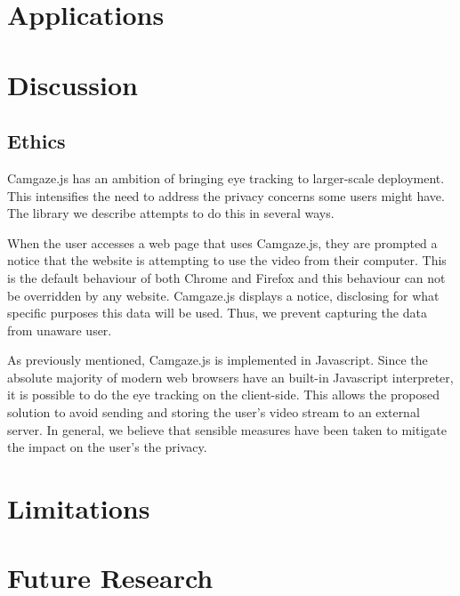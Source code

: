 \documentclass[annual]{acmsiggraph}
\begin{document}
\section{Applications}

\section{Discussion}

\subsection{Ethics}
Camgaze.js has an ambition of bringing eye tracking to larger-scale deployment. This intensifies the need to address the privacy concerns some users might have. The library we describe attempts to do this in several ways.

When the user accesses a web page that uses Camgaze.js, they are prompted a notice that the website is attempting to use the video from their computer. This is the default behaviour of both Chrome and Firefox and this behaviour can not be overridden by any website. Camgaze.js displays a notice, disclosing for what specific purposes this data will be used. Thus, we prevent capturing the data from unaware user.

As previously mentioned, Camgaze.js is implemented in Javascript. Since the absolute majority of modern web browsers have an built-in Javascript interpreter, it is possible to do the eye tracking on the client-side. This allows the proposed solution to avoid sending and storing the user’s video stream to an external server. 
In general, we believe that sensible measures have been taken to mitigate the impact on the user’s the privacy.


\section{Limitations}

\section{Future Research}



\end{document}
